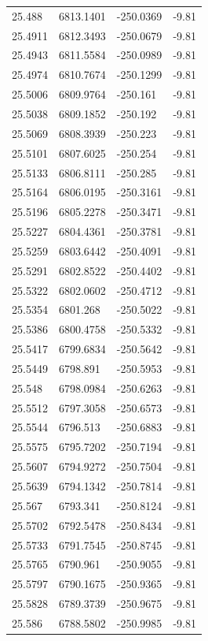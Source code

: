 \begin{table}[H]
\begin{tabular}{llll}
25.488 & 6813.1401 & -250.0369 & -9.81 \\
25.4911 & 6812.3493 & -250.0679 & -9.81 \\
25.4943 & 6811.5584 & -250.0989 & -9.81 \\
25.4974 & 6810.7674 & -250.1299 & -9.81 \\
25.5006 & 6809.9764 & -250.161 & -9.81 \\
25.5038 & 6809.1852 & -250.192 & -9.81 \\
25.5069 & 6808.3939 & -250.223 & -9.81 \\
25.5101 & 6807.6025 & -250.254 & -9.81 \\
25.5133 & 6806.8111 & -250.285 & -9.81 \\
25.5164 & 6806.0195 & -250.3161 & -9.81 \\
25.5196 & 6805.2278 & -250.3471 & -9.81 \\
25.5227 & 6804.4361 & -250.3781 & -9.81 \\
25.5259 & 6803.6442 & -250.4091 & -9.81 \\
25.5291 & 6802.8522 & -250.4402 & -9.81 \\
25.5322 & 6802.0602 & -250.4712 & -9.81 \\
25.5354 & 6801.268 & -250.5022 & -9.81 \\
25.5386 & 6800.4758 & -250.5332 & -9.81 \\
25.5417 & 6799.6834 & -250.5642 & -9.81 \\
25.5449 & 6798.891 & -250.5953 & -9.81 \\
25.548 & 6798.0984 & -250.6263 & -9.81 \\
25.5512 & 6797.3058 & -250.6573 & -9.81 \\
25.5544 & 6796.513 & -250.6883 & -9.81 \\
25.5575 & 6795.7202 & -250.7194 & -9.81 \\
25.5607 & 6794.9272 & -250.7504 & -9.81 \\
25.5639 & 6794.1342 & -250.7814 & -9.81 \\
25.567 & 6793.341 & -250.8124 & -9.81 \\
25.5702 & 6792.5478 & -250.8434 & -9.81 \\
25.5733 & 6791.7545 & -250.8745 & -9.81 \\
25.5765 & 6790.961 & -250.9055 & -9.81 \\
25.5797 & 6790.1675 & -250.9365 & -9.81 \\
25.5828 & 6789.3739 & -250.9675 & -9.81 \\
25.586 & 6788.5802 & -250.9985 & -9.81 \\

\end{tabular}
\end{table}
